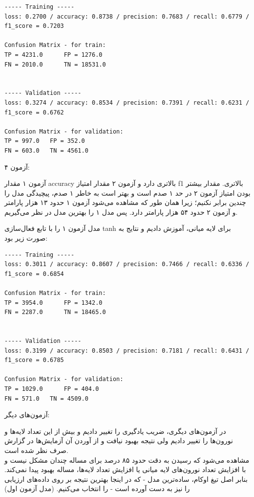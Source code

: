 \documentclass{article}
\begin{document}
\begin{latin}
\begin{lstlisting}
----- Training -----
loss: 0.2700 / accuracy: 0.8738 / precision: 0.7683 / recall: 0.6779 /
f1_score = 0.7203

Confusion Matrix - for train:
TP = 4231.0 	 FP = 1276.0
FN = 2010.0 	 TN = 18531.0


----- Validation -----
loss: 0.3274 / accuracy: 0.8534 / precision: 0.7391 / recall: 0.6231 /
f1_score = 0.6762

Confusion Matrix - for validation:
TP = 997.0 	 FP = 352.0
FN = 603.0 	 TN = 4561.0
\end{lstlisting}
\end{latin}

\bigbreak

آزمون ۴:

آزمون ۱ مقدار accuracy بالاتری دارد و آزمون ۲ مقدار امتیاز f1 بالاتری. مقدار بیشتر بودن امتیاز آزمون ۲ در حد ۱ صدم است و بهتر است به خاطر ۱ صدم، پیچیدگی مدل را چندین برابر نکنیم؛ زیرا همان طور که مشاهده می‌شود آزمون ۱ حدود ۱۳ هزار پارامتر و آزمون ۲ حدود ۵۴ هزار پارامتر دارد. پس مدل ۱ را بهترین مدل در نظر می‌گیریم.

مدل آزمون ۱ را با تابع فعال‌سازی tanh برای لایه میانی، آموزش دادیم و نتایج به صورت زیر بود:

\begin{latin}
\begin{lstlisting}
----- Training -----
loss: 0.3011 / accuracy: 0.8607 / precision: 0.7466 / recall: 0.6336 / 
f1_score = 0.6854

Confusion Matrix - for train:
TP = 3954.0 	 FP = 1342.0
FN = 2287.0 	 TN = 18465.0


----- Validation -----
loss: 0.3199 / accuracy: 0.8503 / precision: 0.7181 / recall: 0.6431 / 
f1_score = 0.6785

Confusion Matrix - for validation:
TP = 1029.0 	 FP = 404.0
FN = 571.0 	 TN = 4509.0
\end{lstlisting}
\end{latin}

\bigbreak


آزمون‌های دیگر:

در آزمون‌های دیگری، ضریب یادگیری را تغییر دادیم و بیش از این تعداد لایه‌ها و نورون‌ها را تغییر دادیم ولی نتیجه بهبود نیافت و از آوردن آن آزمایش‌ها در گزارش صرف نظر شده است.\\ 

مشاهده می‌شود که رسیدن به دقت حدود ۸۵ درصد برای مساله چندان مشکل نیست و با افزایش تعداد نورون‌های لایه میانی یا افزایش تعداد لایه‌ها، مساله بهبود پیدا نمی‌کند. بنابر اصل تیغ اوکام، ساده‌ترین مدل - که در اینجا بهترین نتیجه بر روی داده‌های ارزیابی را نیز به دست آورده است - را انتخاب می‌کنیم. (مدل آزمون اول)
\end{document}
